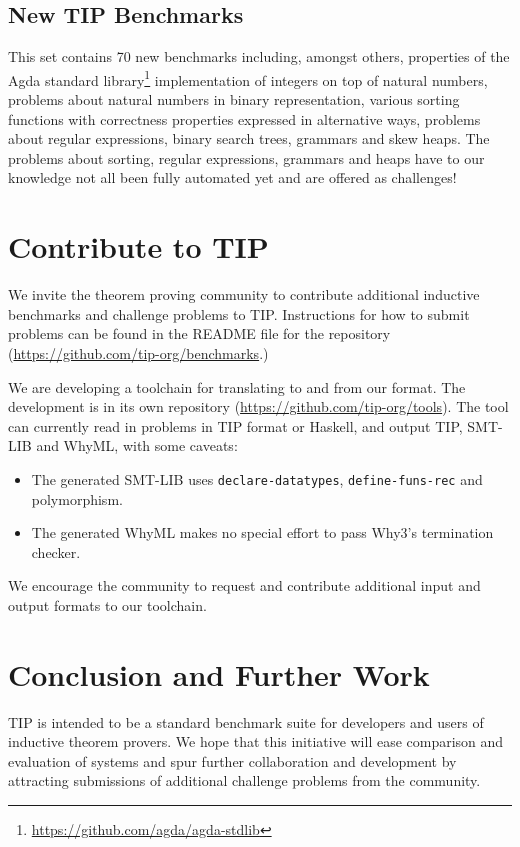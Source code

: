 \documentclass{llncs}
\begin{document}
\subsection{New TIP Benchmarks}
This set contains 70 new benchmarks including, amongst others,
properties of the Agda standard
library\footnote{\url{https://github.com/agda/agda-stdlib}}
implementation of integers on top of natural numbers, problems about natural numbers in binary representation, various sorting functions with correctness properties expressed in alternative ways, problems about regular expressions, binary search trees, grammars and skew heaps. The problems about sorting, regular expressions, grammars and heaps have to our knowledge not all been fully automated yet and are offered as challenges!

\section{Contribute to TIP}
We invite the theorem proving community to contribute additional inductive
benchmarks and challenge problems to TIP. Instructions for how to submit
problems can be found in the README file for the repository
(\url{https://github.com/tip-org/benchmarks}.)

We are developing a toolchain for translating to and from our format. The
development is in its own repository
(\url{https://github.com/tip-org/tools}).
The tool can currently read in problems in TIP format or Haskell, and
output TIP, SMT-LIB and WhyML, with some caveats:
\begin{itemize}
  \item The generated SMT-LIB uses \verb|declare-datatypes|,
    \verb|define-funs-rec| and polymorphism.
  \item The generated WhyML makes no special effort to pass Why3's
    termination checker.
\end{itemize}
We encourage the community to request and contribute additional input
and output formats to our toolchain.

\section{Conclusion and Further Work}

TIP is intended to be a standard benchmark suite for developers 
and users of inductive theorem provers. We hope that this 
initiative will ease comparison and evaluation of systems and 
spur further collaboration and development by attracting 
submissions of additional challenge problems from the community.
\end{document}

